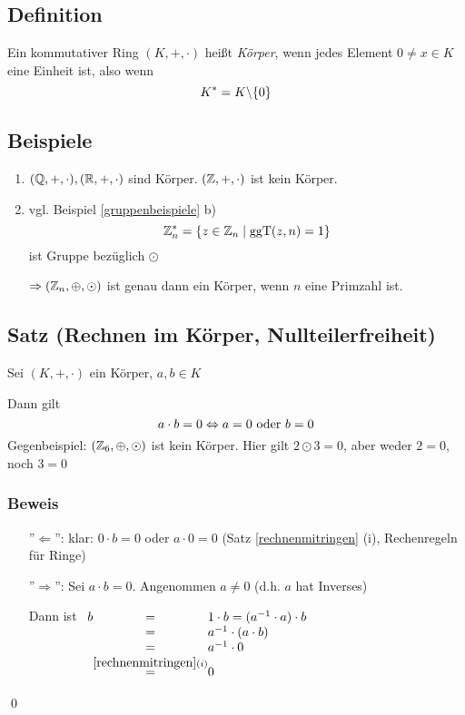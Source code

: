 


\subsection[Definition: Körper]{Definition}

Ein kommutativer Ring $(K, +, \cdot)$ heißt \emph{Körper}, wenn jedes Element $0 \neq x \in K$ eine Einheit ist, also wenn
%
\[K^* = K \backslash \{0\}\]

\subsection{Beispiele}

\begin{enumerate}
	\item
	$(\mathbb{Q}, +, \cdot), (\mathbb{R}, +, \cdot)$ sind Körper. $(\mathbb{Z}, +, \cdot)$ ist kein Körper.
	
	\item
	vgl. Beispiel \ref{gruppenbeispiele} b)
	\[\mathbb{Z}_n^* = \left\{z \in \mathbb{Z}_n \;|\; \mathrm{ ggT }(z, n) = 1\right\}\]
	ist Gruppe bezüglich $\odot$
	
	$\Rightarrow (\mathbb{Z}_n, \oplus, \odot)$ ist genau dann ein Körper, wenn $n$ eine Primzahl ist.
\end{enumerate}

\subsection[Satz: Rechnen im Körper, Nullteilerfreiheit]{Satz (Rechnen im Körper, Nullteilerfreiheit)}

Sei $(K, +, \cdot)$ ein Körper, $a, b \in K$

Dann gilt 
\[a \cdot b= 0 \Leftrightarrow a = 0 \text{ oder } b = 0 \]
%
Gegenbeispiel: $(\mathbb{Z}_6, \oplus, \odot)$ ist kein Körper. 
Hier gilt $2 \odot 3 = 0$, aber weder $2=0$, noch $3=0$

\subsubsection*{Beweis}
\begin{itemize}

	\item[''$\Leftarrow$'':]
	klar: $0 \cdot b = 0$ oder $a \cdot 0 = 0$ \;\;(Satz \ref*{rechnenmitringen} (i), Rechenregeln für Ringe)
	
	\item[''$\Rightarrow$'':]
	Sei $a \cdot b = 0$.
	Angenommen $a \neq 0$ (d.h. $a$ hat Inverses)
	
	Dann ist 
	$\begin{array}[t]{l@{}c@{}l}
	b	&=& 1 \cdot b = (a^{-1} \cdot a) \cdot b \\
		&=& a^{-1} \cdot (a \cdot b) \\
		&=& a^{-1} \cdot 0 \\
		&\stackrel{\ref{rechnenmitringen}(i)}{=}& 0
	\end{array}$
	
\end{itemize} \qed


